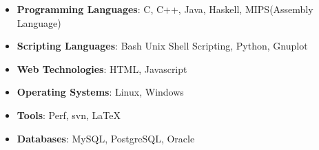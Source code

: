 \begin{itemize}
  \item \textbf{Programming Languages}: C, C++, Java, Haskell, MIPS(Assembly Language) \\[-0.6cm]
  \item \textbf{Scripting Languages}: Bash Unix Shell Scripting, Python, Gnuplot \\[-0.6cm]
  \item \textbf{Web Technologies}: HTML, Javascript \\[-0.6cm]
  \item \textbf{Operating Systems}: Linux, Windows \\[-0.6cm]
  \item \textbf{Tools}: Perf, svn, \LaTeX \\[-0.6cm]
  \item \textbf{Databases}: MySQL, PostgreSQL, Oracle
\end{itemize}
